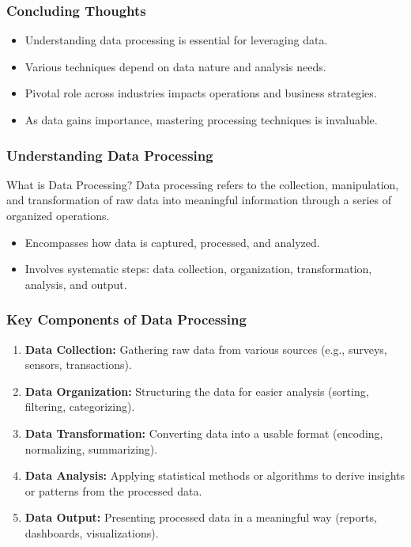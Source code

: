 \documentclass[aspectratio=169]{beamer}
\begin{document}
\begin{frame}[fragile]
    \frametitle{Concluding Thoughts}
    \begin{itemize}
        \item Understanding data processing is essential for leveraging data.
        \item Various techniques depend on data nature and analysis needs.
        \item Pivotal role across industries impacts operations and business strategies.
        \item As data gains importance, mastering processing techniques is invaluable.
    \end{itemize}
\end{frame}

\begin{frame}[fragile]
    \frametitle{Understanding Data Processing}
    \begin{block}{What is Data Processing?}
        Data processing refers to the collection, manipulation, and transformation of raw data into meaningful information through a series of organized operations.
    \end{block}
    
    \begin{itemize}
        \item Encompasses how data is captured, processed, and analyzed.
        \item Involves systematic steps: data collection, organization, transformation, analysis, and output.
    \end{itemize}
\end{frame}

\begin{frame}[fragile]
    \frametitle{Key Components of Data Processing}
    \begin{enumerate}
        \item \textbf{Data Collection:} Gathering raw data from various sources (e.g., surveys, sensors, transactions).
        \item \textbf{Data Organization:} Structuring the data for easier analysis (sorting, filtering, categorizing).
        \item \textbf{Data Transformation:} Converting data into a usable format (encoding, normalizing, summarizing).
        \item \textbf{Data Analysis:} Applying statistical methods or algorithms to derive insights or patterns from the processed data.
        \item \textbf{Data Output:} Presenting processed data in a meaningful way (reports, dashboards, visualizations).
    \end{enumerate}
\end{frame}
\end{document}
